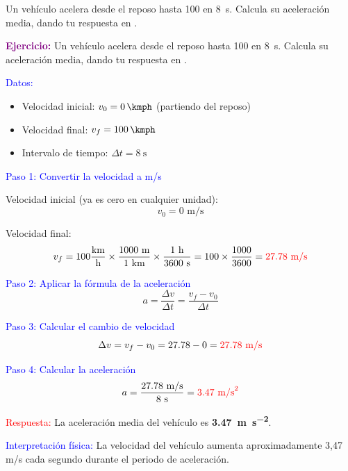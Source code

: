 \begin{exercise}
    Un vehículo acelera desde el reposo hasta \qty{100}{\kmph} en \qty{8}{\s}. Calcula su aceleración media, dando tu respuesta en \unit{\mpss}.
    \begin{solu}
        \textbf{\textcolor{purple}{Ejercicio:}} Un vehículo acelera desde el reposo hasta \qty{100}{\kmph} en \qty{8}{\s}. Calcula su aceleración media, dando tu respuesta en \unit{\mpss}.

        \vspace{0.3cm}

        \textcolor{blue}{Datos:}
        \begin{itemize}
            \item Velocidad inicial: $v_0 = \qty{0}{\kmph}$ (partiendo del reposo)
            \item Velocidad final: $v_f = \qty{100}{\kmph}$
            \item Intervalo de tiempo: $\Delta t = \qty{8}{\s}$
        \end{itemize}

        \textcolor{blue}{Paso 1: Convertir la velocidad a m/s}

        Velocidad inicial (ya es cero en cualquier unidad):
        \[
            v_0 = 0 \text{ m/s}
        \]

        Velocidad final:
        \[
            v_f = 100 \frac{\text{km}}{\text{h}} \times \frac{1000 \text{ m}}{1 \text{ km}} \times \frac{1 \text{ h}}{3600 \text{ s}} = 100 \times \frac{1000}{3600} = \textcolor{red}{27.78 \text{ m/s}}
        \]

        \textcolor{blue}{Paso 2: Aplicar la fórmula de la aceleración}
        \[
            \boxed{a = \frac{\Delta v}{\Delta t} = \frac{v_f - v_0}{\Delta t}}
        \]

        \textcolor{blue}{Paso 3: Calcular el cambio de velocidad}
        \[
            \Delta v = v_f - v_0 = 27.78 - 0 = \textcolor{red}{27.78 \text{ m/s}}
        \]

        \textcolor{blue}{Paso 4: Calcular la aceleración}
        \[
            a = \frac{27.78 \text{ m/s}}{8 \text{ s}} = \textcolor{red}{3.47 \text{ m/s}^2}
        \]

        \textcolor{red}{Respuesta:} La aceleración media del vehículo es \textbf{\qty{3.47}{\metre\per\second\squared}}.

        \textcolor{blue}{Interpretación física:} La velocidad del vehículo aumenta aproximadamente 3,47 m/s cada segundo durante el periodo de aceleración.
    \end{solu}
\end{exercise}


